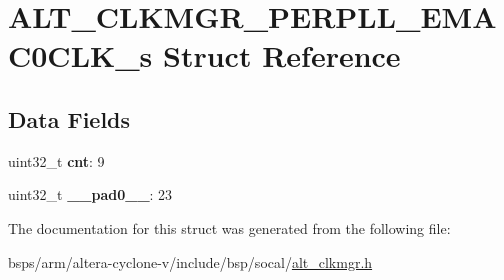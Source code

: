 \hypertarget{structALT__CLKMGR__PERPLL__EMAC0CLK__s}{}\section{A\+L\+T\+\_\+\+C\+L\+K\+M\+G\+R\+\_\+\+P\+E\+R\+P\+L\+L\+\_\+\+E\+M\+A\+C0\+C\+L\+K\+\_\+s Struct Reference}
\label{structALT__CLKMGR__PERPLL__EMAC0CLK__s}
\subsection*{Data Fields}
\begin{DoxyCompactItemize}
\item 
\mbox{\label{structALT__CLKMGR__PERPLL__EMAC0CLK__s_ab5d038717579132fb6b5b029fca4e5f4}} 
uint32\+\_\+t {\bfseries cnt}\+: 9
\item 
\mbox{\label{structALT__CLKMGR__PERPLL__EMAC0CLK__s_a56089c88a5ab38703cec0819faf0daac}} 
uint32\+\_\+t {\bfseries \+\_\+\+\_\+pad0\+\_\+\+\_\+}\+: 23
\end{DoxyCompactItemize}


The documentation for this struct was generated from the following file\+:\begin{DoxyCompactItemize}
\item 
bsps/arm/altera-\/cyclone-\/v/include/bsp/socal/\mbox{\hyperlink{alt__clkmgr_8h}{alt\+\_\+clkmgr.\+h}}\end{DoxyCompactItemize}
